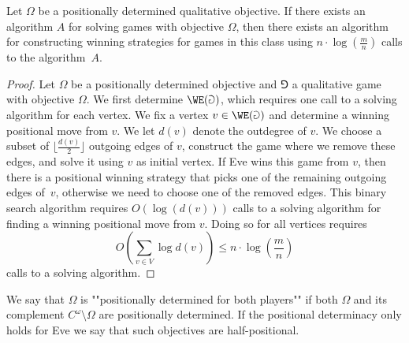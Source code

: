 \begin{lemma}
\label{1-lem:constructing_winning_strategy}
Let $\Omega$ be a positionally determined qualitative objective.
If there exists an algorithm $A$ for solving games with objective $\Omega$,
then there exists an algorithm for constructing winning strategies for games in this class 
using $n \cdot \log(\frac{m}{n})$ calls to the algorithm~$A$.
\end{lemma}

\begin{proof}
Let $\Omega$ be a positionally determined objective and $\Game$ a qualitative game with objective $\Omega$.
We first determine $\WE(\Game)$, which requires one call to a solving algorithm for each vertex.
We fix a vertex $v \in \WE(\Game)$ and determine a winning positional move from $v$.
We let $d(v)$ denote the outdegree of $v$.
We choose a subset of $\lfloor \frac{d(v)}{2} \rfloor$ outgoing edges of $v$, construct the game where we remove these edges,
and solve it using $v$ as initial vertex.
If Eve wins this game from $v$, then there is a positional winning strategy that picks one of the remaining outgoing edges of~$v$,
otherwise we need to choose one of the removed edges.
This binary search algorithm requires $O(\log(d(v)))$ calls to a solving algorithm for finding a winning positional move from $v$.
Doing so for all vertices requires 
\[
O\left( \sum_{v \in V} \log d(v) \right) \le n \cdot \log \left( \frac{m}{n} \right)
\]
calls to a solving algorithm.
\end{proof}

We say that $\Omega$ is ""positionally determined for both players"" if both $\Omega$ and its complement $C^\omega \setminus \Omega$ are positionally determined.
If the positional determinacy only holds for Eve we say that such objectives are half-positional. 

